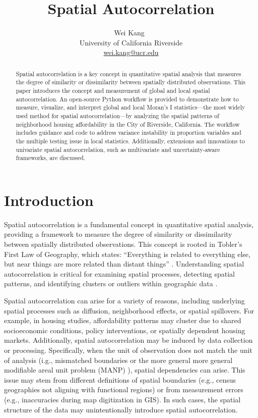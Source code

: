 \documentclass[
]{aft}
\title{Spatial Autocorrelation}
\author{
Wei Kang~\orcidlink{0000-0002-1073-7781}\\University of California
Riverside\\\href{mailto:wei.kang@ucr.edu}{wei.kang@ucr.edu}}
\date{}
\begin{document}
\maketitle
\begin{abstract}
Spatial autocorrelation is a key concept in quantitative spatial
analysis that measures the degree of similarity or dissimilarity between
spatially distributed observations. This paper introduces the concept
and measurement of global and local spatial autocorrelation. An
open-source Python workflow is provided to demonstrate how to measure,
visualize, and interpret global and local Moran's I statistics---the
most widely used method for spatial autocorrelation---by analyzing the
spatial patterns of neighborhood housing affordability in the City of
Riverside, California. The workflow includes guidance and code to
address variance instability in proportion variables and the multiple
testing issue in local statistics. Additionally, extensions and
innovations to univariate spatial autocorrelation, such as multivariate
and uncertainty-aware frameworks, are discussed.
\end{abstract}


\section{Introduction}\label{sec-intro}

Spatial autocorrelation is a fundamental concept in quantitative spatial
analysis, providing a framework to measure the degree of similarity or
dissimilarity between spatially distributed observations. This concept
is rooted in Tobler's First Law of Geography, which states: ``Everything
is related to everything else, but near things are more related than
distant things'' \citep{Tobler:1970vs}. Understanding spatial
autocorrelation is critical for examining spatial processes, detecting
spatial patterns, and identifying clusters or outliers within geographic
data \citep{Anselin:2016}.

Spatial autocorrelation can arise for a variety of reasons, including
underlying spatial processes such as diffusion, neighborhood effects, or
spatial spillovers. For example, in housing studies, affordability
patterns may cluster due to shared socioeconomic conditions, policy
interventions, or spatially dependent housing markets. Additionally,
spatial autocorrelation may be induced by data collection or processing.
Specifically, when the unit of observation does not match the unit of
analysis (i.g., mismatched boundaries or the more general more general
modifiable areal unit problem (MANP) \citep{manley2021scale}), spatial
dependencies can arise. This issue may stem from different definitions
of spatial boundaries (e.g., census geographies not aligning with
functional regions) or from measurement errors (e.g., inaccuracies
during map digitization in GIS). In such cases, the spatial structure of
the data may unintentionally introduce spatial autocorrelation.
\end{document}
